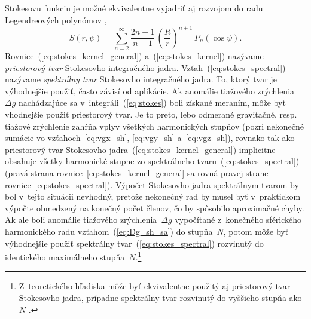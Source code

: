 \documentclass[a4paper, 12pt]{book}
\begin{document}
Stokesovu funkciu je možné ekvivalentne vyjadriť aj rozvojom do radu 
Legendreových polynómov \parencite{MoritzPhysicalGeodesy},
%
\begin{equation}
\label{eq:stokes_spectral}
S(r, \psi) = \sum_{n = 2}^{\infty} \frac{2n + 1}{n - 1} \, \left( \frac{R}{r} 
\right)^{n + 1} \, P_n(\cos\psi){.}
\end{equation}
%
Rovnice~(\ref{eq:stokes_kernel_general}) a~(\ref{eq:stokes_kernel}) nazývame 
\emph{priestorový tvar} Stokesovho integračného jadra.  
Vzťah~(\ref{eq:stokes_spectral}) nazývame \emph{spektrálny tvar} Stokesovho 
integračného jadra.  To, ktorý tvar je výhodnejšie použiť, často závisí od 
aplikácie.  Ak anomálie tiažového zrýchlenia~$\Delta g$ nachádzajúce sa 
v~integráli~(\ref{eq:stokes}) boli získané meraním, môže byť vhodnejšie použiť 
priestorový tvar.  Je to preto, lebo odmerané gravitačné, resp. tiažové 
zrýchlenie zahŕňa vplyv všetkých harmonických stupňov (pozri nekonečné sumácie 
vo vzťahoch~\ref{eq:vgx_sh}, \ref{eq:vgy_sh} a~\ref{eq:vgz_sh}), rovnako tak 
ako priestorový tvar Stokesovho jadra~(\ref{eq:stokes_kernel_general}) 
implicitne obsahuje všetky harmonické stupne zo spektrálneho 
tvaru~(\ref{eq:stokes_spectral}) (pravá strana 
rovnice~\ref{eq:stokes_kernel_general} sa rovná pravej strane 
rovnice~\ref{eq:stokes_spectral}).  Výpočet Stokesovho jadra spektrálnym tvarom 
by bol v~tejto situácii nevhodný, pretože nekonečný rad by musel byť 
v~praktickom výpočte obmedzený na konečný počet členov, čo by spôsobilo 
aproximačné chyby.  Ak ale boli anomálie tiažového zrýchlenia~$\Delta g$ 
vypočítané z~konečného sférického harmonického radu vzťahom~(\ref{eq:Dg_sh_sa}) 
do stupňa~$N$, potom môže byť výhodnejšie použiť spektrálny 
tvar~(\ref{eq:stokes_spectral}) rozvinutý do identického maximálneho 
stupňa~$N$.\footnote{Z~teoretického hľadiska môže byť ekvivalentne použitý aj 
priestorový tvar Stokesovho jadra, prípadne spektrálny tvar rozvinutý do 
vyššieho stupňa ako~$N$ \parencite[pozri napríklad][]{Freeden2009}.}
\end{document}
